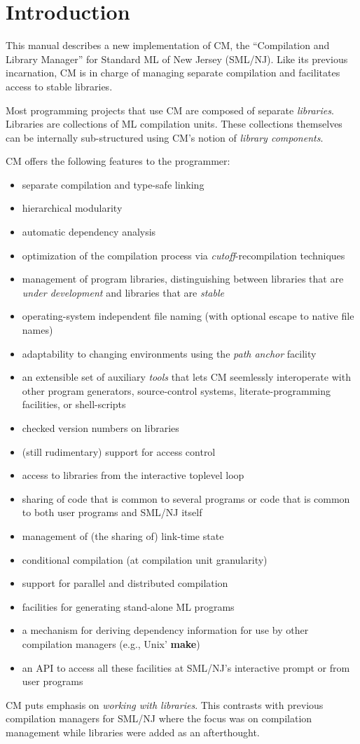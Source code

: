 %

\chapter{Introduction}

This manual describes a new implementation of CM, the ``Compilation
and Library Manager'' for Standard ML of New Jersey (SML/NJ).  Like
its previous incarnation, CM is in charge of managing separate
compilation and facilitates access to stable libraries.

Most programming projects that use CM are composed of separate {\em
libraries}.  Libraries are collections of ML compilation units.  These
collections themselves can be internally sub-structured using CM's
notion of {\em library components}.

CM offers the following features to the programmer:

\begin{itemize}
\item separate compilation and type-safe linking~\cite{appel94:sepcomp}
\item hierarchical modularity~\cite{blume:appel:cm99}
\item automatic dependency analysis~\cite{blume:depend99}
\item optimization of the compilation process via {\em
cutoff}-recompilation techniques~\cite{tichy94}
\item management of program libraries, distinguishing between libraries
that are {\em under development} and libraries that are {\em stable}
\item operating-system independent file naming (with optional escape
to native file names)
\item adaptability to changing environments using the {\em path anchor}
facility
\item an extensible set of auxiliary {\em tools} that lets CM
seemlessly interoperate with other program generators, source-control
systems, literate-programming facilities, or shell-scripts
\item checked version numbers on libraries
\item (still rudimentary) support for access control
\item access to libraries from the interactive toplevel loop
\item sharing of code that is common to several programs or code that
is common to both user programs and SML/NJ itself
\item management of (the sharing of) link-time state
\item conditional compilation (at compilation unit granularity)
\item support for parallel and distributed compilation
\item facilities for generating stand-alone ML programs
\item a mechanism for deriving dependency information for use
by other compilation managers (e.g., Unix' {\bf make})
\item an API to access all these facilities at SML/NJ's interactive
prompt or from user programs
\end{itemize}

CM puts emphasis on {\em working with libraries}.  This contrasts with
previous compilation managers for SML/NJ where the focus was on
compilation management while libraries were added as an afterthought.


